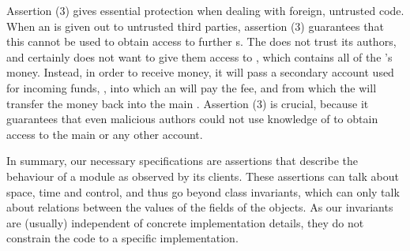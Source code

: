 Assertion (3) gives essential protection when dealing with foreign, untrusted code.
When an  is given out to untrusted third parties, assertion (3) guarantees that
this  cannot be used to obtain access to further  s. 
The  does not trust its authors, and certainly does not want
to give them access to , which contains all of
the 's money. Instead, in order to receive money, it will
pass a secondary account used for incoming funds, ,
into which an   will pay the fee, and from which the  will transfer the money
back into the main . Assertion (3) is crucial, because it guarantees that even 
malicious authors  could not use knowledge of   to obtain access to
the main  or any other account. %

 
\vspace{.1cm} 

In summary, our  necessary specifications are assertions that describe the
behaviour of a module as observed by its clients. 
These assertions
 can talk about space, time and control, and thus go beyond
 class invariants, which can only
talk   about relations between the  values of the fields of the objects.
As our invariants are (usually) independent of concrete implementation details, they do not constrain the code to a
specific implementation.
